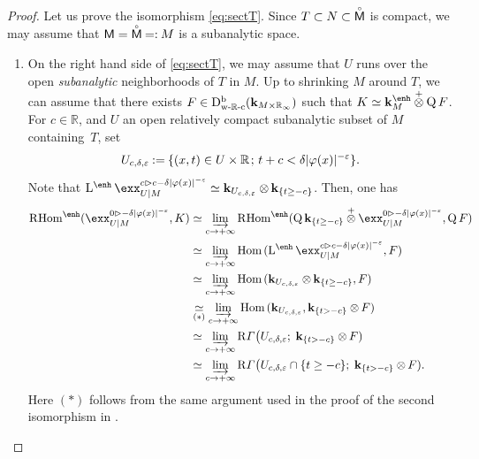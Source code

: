 \documentclass[JEP,XML,SOM,Unicode]{cedram}
\newenvironment{enumeratei}
{\bgroup\def\theenumi{\roman{enumi}}\def\theenumii{\alph{enumii}}\begin{enumerate}}
{\end{enumerate}\egroup}
\newcommand{\semicolon}{\nobreak \mskip2mu\mathpunct{}\nonscript\mkern-\thinmuskip{;}\mskip6mu plus1mu\relax}
\newcommand{\bl}{\bigl(}
\theoremstyle{plain}
\theoremstyle{definition}
\newcommand{\R}{\mathbb{R}}
\newcommand{\bR}{{\R_\infty}}
\DeclareMathOperator{\quot}{Q}
\newcommand{\derived}[1]{\mathrm{#1}}
\newcommand{\derd}{\derived{D}}
\newcommand{\derr}{\derived{R}}
\newcommand{\BDC}{\derd^{\mathrm{b}}}
\newcommand{\Hom}[1][]{\mathrm{Hom}_{\raise1.5ex\hbox to.1em{}#1}}
\newcommand{\RHom}[1][]{\derr\mathrm{Hom}_{\raise1.5ex\hbox to.1em{}#1}}
\newcommand{\FHom}{\RHom^\enh}
\newcommand{\LE}{\operatorname{L^\enh}}
\newcommand{\wRc}{{\mathrm{w}\text-\R\text-\mathrm{c}}}
\newcommand{\field}{\mathbf{k}}\let\cor\field
\newcommand{\unbordered}[1]{{\accentset{\circ}{#1}}}
\newcommand{\ctens}{\mathbin{\mathop\otimes\limits^+}}
\newcommand{\range}[2]{#1 \mathbin{\rhd} #2}
\newcommand{\rsect}{\derr\varGamma}
\newcommand{\bbM}{\mathsf{M}}
\newcommand{\obM}{\unbordered{\bbM}}
\newcommand{\defeq}{\mathbin{:=}}\let \seteq\defeq
\newcommand{\eqdef}{\mathbin{=:}}
\newcommand{\tens}[1][]{\mathbin{\otimes_{\raise1.5ex\hbox to-.1em{}#1}}}
\newcommand{\ilim}[1][]{\mathop{\varinjlim}\limits_{#1}}
\newcommand{\st}[1]{{\{{#1}\}}}
\begin{document}
\begin{proof}
Let us prove the isomorphism \eqref{eq:sectT}. Since $T\subset N\subset \obM$ is compact,
we may assume that $\bbM=\obM\eqdef M$ is a subanalytic space.

\begin{enumeratei}
\item\label{pf:i}
On the right hand side of \eqref{eq:sectT}, we may assume that $U$ runs over the open \emph{subanalytic} neighborhoods of $T$ in $M$.
Up to shrinking $M$ around $T$, we can assume that there exists $F\in\BDC_\wRc
(\field_{M\times\bR})$ such that $K \simeq \field_M^\enh\ctens \quot F$. For $c\in\R$, and $U$ an open relatively compact subanalytic subset of $M$ containing~$T$, set
\[
U_{c,\delta,\varepsilon} \defeq \st{(x,t)\in U\times\R \semicolon t+c<\delta|\varphi(x)|^{-\varepsilon}}.
\]
Note that $\LE \exx^{\range{c}{c-\delta|\varphi(x)|^{-\varepsilon}}}_{U|M} \simeq \field_{U_{c,\delta,\varepsilon}}\tens\field_{\st{ t\geq -c}}$.
Then, one has
\begin{align*}
\FHom(\exx^{\range0{-\delta|\varphi(x)|^{-\varepsilon}}}_{U|M},K)
&\simeq
\ilim[c\to+\infty]\FHom(\quot\field_{\st{t\geq -c}}\ctens\exx^{\range0{-\delta|\varphi(x)|^{-\varepsilon}}}_{U|M},\quot F) \\
&\simeq
\ilim[c\to+\infty]\Hom(\LE\exx^{\range{c}{c-\delta|\varphi(x)|^{-\varepsilon}}}_{U|M},F) \\
&\simeq
\ilim[c\to+\infty]\Hom(\field_{U_{c,\delta,\varepsilon}}\tens\field_{\st{t\geq -c}}, F) \\
&\underset{(*)}\simeq \ilim[c\to+\infty]\Hom(\field_{U_{c,\delta,\varepsilon}},\field_{\st{t> -c}}\tens F) \\
&\simeq
\ilim[c\to+\infty]\rsect\bl U_{c,\delta,\varepsilon};\;\field_{\st{t> -c}}\tens F)\\
&\simeq
\ilim[c\to+\infty]\rsect\bl U_{c,\delta,\varepsilon}\cap\st{t\ge-c};\;\field_{\st{t> -c}}\tens F).
\end{align*}
Here $(*)$ follows from the same argument used in the proof of the second isomorphism in \cite[(6.6.2)]{KS16}.


\end{enumeratei}
\end{proof}
\end{document}
